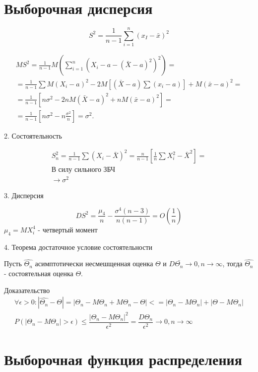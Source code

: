 \section{Выборочная дисперсия}

$$ S^2 = \frac{1}{n-1} \sum\limits_{i=1}^{n} \left(x_I-\bar{x}\right)^2 $$

\begin{multline}
  M S^2 = \frac{1}{n-1} M(\sum_{i=1}^{n} (X_i - a - (\bar{X} - a)^2)^2 ) = \\
  = \frac{1}{n-1} \sum M (X_i-a)^2 - 2 M[ (\bar{X} - a) \sum (x_i - a) ] + M (\bar{x} -a)^2 = \\
  = \frac{1}{n-1} \left[ n \sigma^2 - 2 n M(\bar{X}-a)^2 + n M (\bar{x}-a)^2 \right] = \\
  = \frac{1}{n-1} \left[ n \sigma^2 - n \frac{\sigma^2}{n} \right] = \sigma^2.
\end{multline}

2. Состоятельность 

\begin{multline*}
  S_n^2 = \frac{1}{n-1} \sum (X_i - \bar{X})^2 = \frac{n}{n-1} \left[ \frac{1}{n} \sum X_i^2 - \bar{X}^2 \right] = \\
  \text{В силу сильного ЗБЧ} \\
  \to \sigma^2
\end{multline*}

3. Дисперсия

 
$$D S^2 = \dfrac{\mu_4}{n} - \dfrac{\sigma^4 (n-3)}{n (n-1)} = O \left(\frac{1}{n} \right)$$
$\mu_4 = M X_i^4$ - четвертый момент

4. Теорема достаточное условие состоятельности

Пусть $\hat{\Theta_n}$ асимптотически несмешщенная оценка $\Theta$ и $D \bar{\Theta_n} \to 0, n \to \infty$, тогда $\hat{\Theta_n}$ - состоятельная оценка $\Theta$.

Доказательство
\begin{multline*}
  \forall \epsilon > 0: | \hat{\Theta_n} - \Theta| = |\Theta_n - M \Theta_n + M \Theta_n - \Theta| <= |\Theta_n - M\Theta_n| + | \Theta - M \Theta_n | \\
  P( | \Theta_n - M \Theta_n| > \epsilon) \leqslant \dfrac{|\Theta_n - M \Theta_n| ^2} {\epsilon^2} =  \dfrac{D \Theta_n} {\epsilon^2} \to 0, n \to \infty
\end{multline*}

\section{Выборочная функция распределения}

